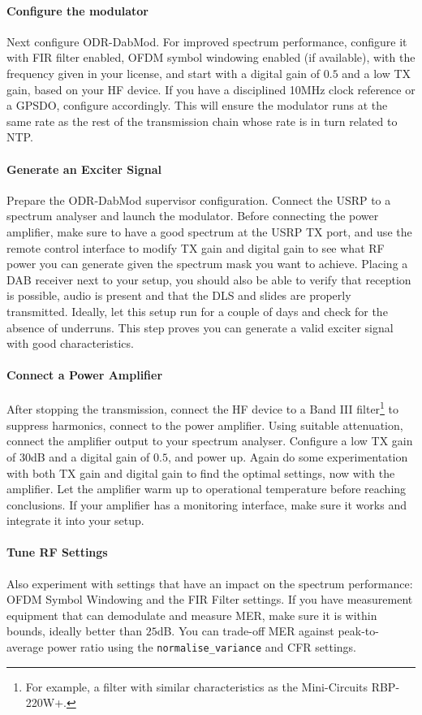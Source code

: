 \paragraph{Configure the modulator}
Next configure ODR-DabMod. For improved spectrum performance, configure it with
FIR filter enabled, OFDM symbol windowing enabled (if available), with the
frequency given in your license, and start with a digital gain of $0.5$ and a low
TX gain, based on your HF device. If you have a disciplined 10MHz clock reference
or a GPSDO, configure accordingly. This will ensure the modulator runs at the same
rate as the rest of the transmission chain whose rate is in turn related to NTP.

\paragraph{Generate an Exciter Signal}
Prepare the ODR-DabMod supervisor configuration. Connect the USRP to a spectrum
analyser and launch the modulator. Before connecting the power amplifier, make
sure to have a good spectrum at the USRP TX port, and use the remote control
interface to modify TX gain and digital gain to see what RF power you can
generate given the spectrum mask you want to achieve. Placing a DAB receiver
next to your setup, you should also be able to verify that reception is
possible, audio is present and that the DLS and slides are properly transmitted.
Ideally, let this setup run for a couple of days and check for the absence of
underruns. This step proves you can generate a valid exciter signal with good
characteristics.

\paragraph{Connect a Power Amplifier}
After stopping the transmission, connect the HF device to a Band III
filter\footnote{For example, a filter with similar characteristics as the
Mini-Circuits RBP-220W+.} to suppress harmonics, connect to the power amplifier.
Using suitable attenuation, connect the amplifier output to your spectrum
analyser.
Configure a low TX gain of $30$dB and a digital gain of $0.5$, and power up.
Again do some experimentation with both TX gain and digital gain to find the
optimal settings, now with the amplifier. Let the amplifier warm up to
operational temperature before reaching conclusions. If your amplifier has a
monitoring interface, make sure it works and integrate it into your setup.

\paragraph{Tune RF Settings}
Also experiment with settings that have an impact on the spectrum performance:
OFDM Symbol Windowing and the FIR Filter settings.
If you have measurement equipment that can demodulate and measure MER, make sure
it is within bounds, ideally better than $25$dB.
You can trade-off MER against peak-to-average power ratio using the
\verb+normalise_variance+ and CFR settings.

